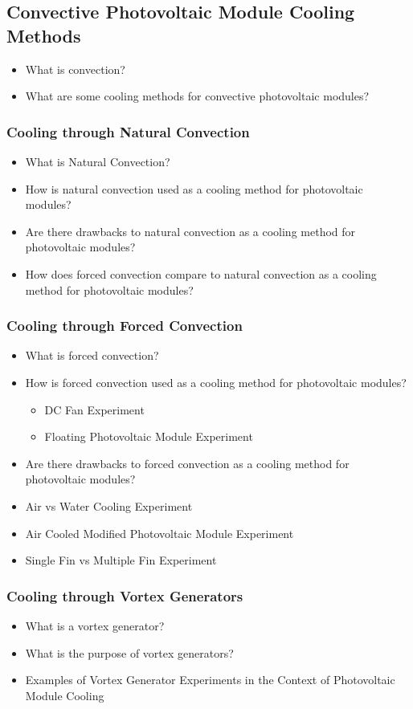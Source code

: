 \subsection{Convective Photovoltaic Module Cooling Methods}
\begin{itemize}
    \item What is convection?
    \item What are some cooling methods for convective photovoltaic modules?
\end{itemize}

\subsubsection{Cooling through Natural Convection}
\begin{itemize}
    \item What is Natural Convection?
    \item How is natural convection used as a cooling method for photovoltaic modules?
    \item Are there drawbacks to natural convection as a cooling method for photovoltaic modules?
    \item How does forced convection compare to natural convection as a cooling method for photovoltaic modules?
\end{itemize}

\subsubsection{Cooling through Forced Convection}
\begin{itemize}
    \item What is forced convection?
    \item How is forced convection used as a cooling method for photovoltaic modules?
    \begin{itemize}
        \item DC Fan Experiment
        \item Floating Photovoltaic Module Experiment
    \end{itemize}
    \item Are there drawbacks to forced convection as a cooling method for photovoltaic modules?
    \item Air vs Water Cooling Experiment
    \item Air Cooled Modified Photovoltaic Module Experiment
    \item Single Fin vs Multiple Fin Experiment
\end{itemize}

\subsubsection{Cooling through Vortex Generators}
\begin{itemize}
    \item What is a vortex generator?
    \item What is the purpose of vortex generators?
    \item Examples of Vortex Generator Experiments in the Context of Photovoltaic Module Cooling
\end{itemize}